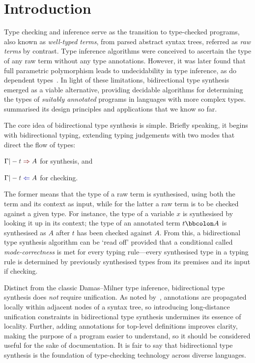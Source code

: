 
\section{Introduction}\label{sec:intro}

Type checking and inference serve as the transition to type-checked programs, also known as \emph{well-typed terms}, from parsed abstract syntax trees, referred as \emph{raw terms} by contrast.
Type inference algorithms were conceived to ascertain the type of any raw term without any type annotations.
However, it was later found that full parametric polymorphism leads to undecidability in type inference, as do dependent types~\citep{Wells1999,Dowek1993}.
In light of these limitations, bidirectional type synthesis emerged as a viable alternative, providing decidable algorithms for determining the types of \emph{suitably annotated} programs in languages with more complex types. 
\citet{Dunfield2021} summarised its design principles and applications that we know so far. 

The core idea of bidirectional type synthesis is simple.
Briefly speaking, it begins with bidirectional typing, extending typing judgements with two modes that direct the flow of types:
\begin{enumerate*}
  \item $\Gamma |- \isTerm{t} \syn A$ for synthesis, and 
  \item $\Gamma |- \isTerm{t} \chk A$ for checking.
\end{enumerate*}
The former means that the type of a raw term is synthesised, using both the term and its context as input, while for the latter a raw term is to be checked against a given type.
For instance, the type of a variable $x$ is synthesised by looking it up in its context; the type of an annotated term $t \annotate A$ is synthesised as $A$ after $t$ has been checked against $A$.
From this, a bidirectional type synthesis algorithm can be `read off' provided that a conditional called \emph{mode-correctness} is met for every typing rule---every synthesised type in a typing rule is determined by previously synthesised types from its premises and its input if checking.

Distinct from the classic Damas--Milner type inference, bidirectional type synthesis does \emph{not} require unification.
As noted by~\citet{Pierce2000}, annotations are propagated locally within adjacent nodes of a syntax tree, so introducing long-distance unification constraints in bidirectional type synthesis undermines its essence of locality.
Further, adding annotations for top-level definitions improves clarity, making the purpose of a program easier to understand, so it should be considered useful for the sake of documentation.
It is fair to say that bidirectional type synthesis is the foundation of type-checking technology across diverse languages.

